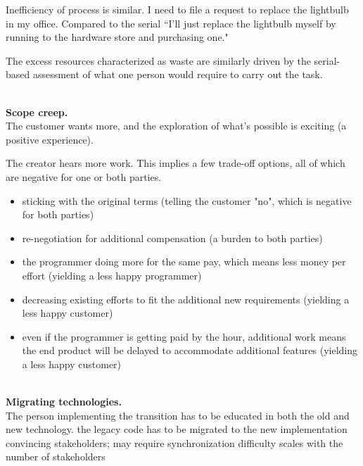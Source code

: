 Inefficiency of process is similar. I need to file a request to replace the lightbulb in my office. Compared to the serial ``I'll just replace the lightbulb myself by running to the hardware store and purchasing one."

The excess resources characterized as waste are similarly driven by the serial-based assessment of what one person would require to carry out the task. 

\ \\

\textbf{Scope creep.} \\
The customer wants more, and the exploration of what's possible is exciting (a positive experience).

The creator hears more work. This implies a few trade-off options, all of which are negative for one or both parties.
\begin{itemize}
    \item sticking with the original terms (telling the customer "no", which is negative for both parties)
    \item re-negotiation for additional compensation (a burden to both parties)
    \item the programmer doing more for the same pay, which means less money per effort (yielding a less happy programmer)
    \item decreasing existing efforts to fit the additional new requirements (yielding a less happy customer)
    \item even if the programmer is getting paid by the hour, additional work means the end product will be delayed to accommodate additional features (yielding a less happy customer)
\end{itemize}

\ \\

\textbf{Migrating technologies.} \\
The person implementing the transition has to be educated in both the old and new technology. 
the legacy code has to be migrated to the new implementation
convincing stakeholders; may require synchronization
difficulty scales with the number of stakeholders 